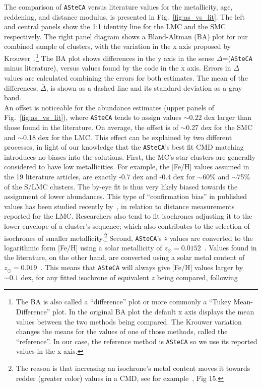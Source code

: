 \documentclass{aa}
\begin{document}
The comparison of \texttt{ASteCA} versus literature values for the metallicity,
age, reddening, and distance modulus, is presented in
Fig.~\ref{fig:as_vs_lit}. The left and central panels show the 1:1 identity line
for the LMC and the SMC respectively.
%
The right panel diagram shows a Bland-Altman (BA) plot for our combined sample
of clusters, with the variation in the x axis proposed by Krouwer~\citep
{Bland_1986,Krouwer_2008}.\footnote{The BA is
also called a ``difference'' plot or more commonly a ``Tukey Mean-Difference''
plot. In the original BA plot the default x axis displays the mean values
between the two methods being compared. The Krouwer variation changes the means
for the values of one of those methods, called the ``reference''. In our case,
the reference method is \texttt{ASteCA} so we use its reported values in the x
axis.}
%
The BA plot shows differences in the y axis in the sense $\Delta$=(\texttt
{ASteCA} minus literature), versus values found by the code in the x axis. Errors
in $\Delta$ values are calculated combining the errors for both estimates. The
mean of the differences, $\overline{\Delta}$, is shown as a dashed line and its
standard deviation as a gray band.\\

An offset is noticeable for the abundance estimates (upper panels of
Fig.~\ref{fig:as_vs_lit}), where \texttt{ASteCA} tends to assign values
$\sim$0.22 dex larger than those found in the literature.
On average, the offset is of $\sim$0.27 dex for the SMC and $\sim$0.18 dex for
the LMC.\@
%
This effect can be explained by two different processes, in light of our
knowledge that the \texttt{ASteCA}'s best fit CMD matching introduces no
biases into the solutions.
%
First, the MC's star clusters are generally considered to have low
metallicities. For example, the [Fe/H] values assumed in the 19
literature articles, are exactly -0.7 dex and -0.4 dex for $\sim$60\% and
$\sim$75\% of the S/LMC clusters. The by-eye fit is thus very likely biased
towards the assignment of lower abundances. This type of ``confirmation
bias'' in published values has been studied recently by~\cite{de_Grijs_2014}, in
relation to distance measurements reported for the LMC.\@
Researchers also tend to fit isochrones adjusting it to the lower envelope of a
cluster's sequence; which also contributes to the selection of isochrones of
smaller metallicity.\footnote{The reason is that increasing an isochrone's metal
content moves it towards redder (greater color) values in a CMD, see for
example~\cite{Bressan_2012}, Fig 15.}
%
Second, \texttt{ASteCA}'s $z$ values are converted to the logarithmic form 
[Fe/H]
using a solar metallicity of $z_{\odot}{=}0.0152$~\citep{Bressan_2012}.
Values found in the literature, on the other hand, are converted using a solar
metal content of $z_{\odot}{=}0.019$~\citep{Marigo_2008}. This means that
\texttt{ASteCA} will always give [Fe/H] values larger by ${\sim}0.1$ dex, for
any fitted isochrone of equivalent $z$ being compared, following
\end{document}
